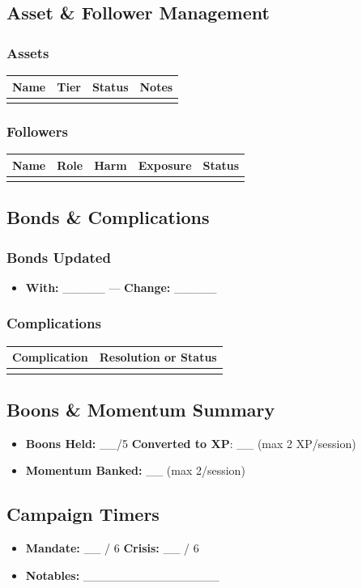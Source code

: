 \subsection{Asset \& Follower Management}
\subsubsection*{Assets}
\begin{tabular}{|l|c|c|c|}
\hline
\textbf{Name} & \textbf{Tier} & \textbf{Status} & \textbf{Notes} \\
\hline
 & & & \\
\hline
\end{tabular}

\subsubsection*{Followers}
\begin{tabular}{|l|c|c|c|c|}
\hline
\textbf{Name} & \textbf{Role} & \textbf{Harm} & \textbf{Exposure} & \textbf{Status} \\
\hline
 & & & & \\
\hline
\end{tabular}

\subsection{Bonds \& Complications}
\subsubsection*{Bonds Updated}
\begin{itemize}
  \item \textbf{With:} \_\_\_\_\_ --- \textbf{Change:} \_\_\_\_\_
\end{itemize}
\subsubsection*{Complications}
\begin{tabular}{|p{5cm}|p{5cm}|}
\hline
\textbf{Complication} & \textbf{Resolution or Status} \\
\hline
 &  \\
\hline
\end{tabular}

\subsection{Boons \& Momentum Summary}
\begin{itemize}
  \item \textbf{Boons Held:} \_\_/5 \quad \textbf{Converted to XP}: \_\_ (max 2 XP/session)
  \item \textbf{Momentum Banked:} \_\_ (max 2/session)
\end{itemize}

\subsection{Campaign Timers}
\begin{itemize}
  \item \textbf{Mandate:} \_\_ / 6 \qquad \textbf{Crisis:} \_\_ / 6
  \item \textbf{Notables:} \_\_\_\_\_\_\_\_\_\_\_\_\_\_\_\_
\end{itemize}
